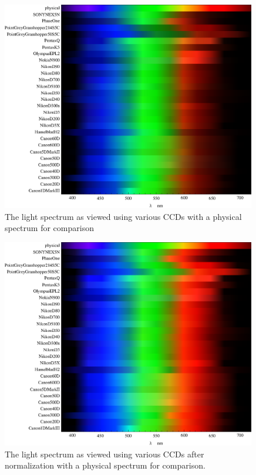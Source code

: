 \begin{figure}[h!]
  \centering
    \includegraphics[width=0.99\textwidth]{Chapter1/Figs/ResponseSpectraStripes.eps}
    \caption{The light spectrum as viewed using various CCDs with a physical spectrum for comparison }  \label{fig:ResponseSpectraStripes}
\end{figure}

\begin{figure}[h!]
  \centering
    \includegraphics[width=0.99\textwidth]{Chapter1/Figs/ResponseSpectraStripesNorm.eps}
    \caption{The light spectrum as viewed using various CCDs after normalization with a physical spectrum for comparison.}  \label{fig:ResponseSpectraStripesNorm}
\end{figure}

